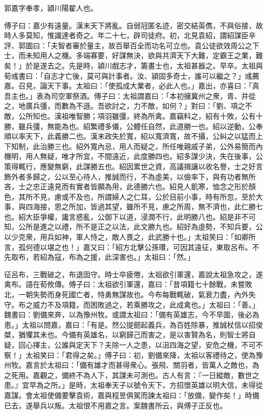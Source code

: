 
\begin{pinyinscope}
郭嘉字奉孝，潁川陽翟人也。

傅子曰：嘉少有遠量。漢末天下將亂。自弱冠匿名迹，密交結英儁，不與俗接，故時人多莫知，惟識達者奇之。年二十七，辟司徒府。初，北見袁紹，謂紹謀臣辛評、郭圖曰：「夫智者審於量主，故百舉百全而功名可立也。袁公徒欲效周公之下士，而未知用人之機。多端寡要，好謀無決，欲與共濟天下大難，定霸王之業，難矣！」於是遂去之。先是時，潁川戲志才，籌畫士也，太祖甚器之。早卒。太祖與荀彧書曰：「自志才亡後，莫可與計事者。汝、潁固多奇士，誰可以繼之？」彧薦嘉。召見，論天下事。太祖曰：「使孤成大業者，必此人也。」嘉出，亦喜曰：「真吾主也。」表為司空軍祭酒。傅子曰：太祖謂嘉曰：「本初擁冀州之衆，青、并從之，地廣兵彊，而數為不遜。吾欲討之，力不敵，如何？」對曰：「劉、項之不敵，公所知也。漢祖唯智勝；項羽雖彊，終為所禽。嘉竊料之，紹有十敗，公有十勝，雖兵彊，無能為也。紹繁禮多儀，公體任自然，此道勝一也。紹以逆動，公奉順以率天下，此義勝二也。漢末政失於寬，紹以寬濟寬，故不攝，公糾之以猛而上下知制，此治勝三也。紹外寬內忌，用人而疑之，所任唯親戚子弟，公外易簡而內機明，用人無疑，唯才所宜，不間遠近，此度勝四也。紹多謀少決，失在後事，公策得輒行，應變無窮，此謀勝五也。紹因累世之資，高議揖讓以收名譽，士之好言飾外者多歸之，公以至心待人，推誠而行，不為虛美，以儉率下，與有功者無所吝，士之忠正遠見而有實者皆願為用，此德勝六也。紹見人飢寒，恤念之形於顏色，其所不見，慮或不及也，所謂婦人之仁耳，公於目前小事，時有所忽，至於大事，與四海接，恩之所加，皆過其望，雖所不見，慮之所周，無不濟也，此仁勝七也。紹大臣爭權，讒言惑亂，公御下以道，浸潤不行，此明勝八也。紹是非不可知，公所是進之以禮，所不是正之以法，此文勝九也。紹好為虛勢，不知兵要，公以少克衆，用兵如神，軍人恃之，敵人畏之，此武勝十也。」太祖笑曰：「如卿所言，孤何德以堪之也！」嘉又曰：「紹方北擊公孫瓚，可因其遠征，東取呂布。不先取布，若紹為寇，布為之援，此深害也。」太祖曰：「然。」

征呂布，三戰破之，布退固守。時士卒疲倦，太祖欲引軍還，嘉說太祖急攻之，遂禽布。語在荀攸傳。傅子曰：太祖欲引軍還，嘉曰：「昔項籍七十餘戰，未嘗敗北，一朝失勢而身死國亡者，恃勇無謀故也。今布每戰輒破，氣衰力盡，內外失守。布之威力不及項籍，而困敗過之，若乘勝攻之，此成禽也。」太祖曰：「善。」魏書曰：劉備來奔，以為豫州牧。或謂太祖曰：「備有英雄志，今不早圖，後必為患。」太祖以問嘉，嘉曰：「有是。然公提劒起義兵，為百姓除暴，推誠杖信以招俊桀，猶懼其未也。今備有英雄名，以窮歸己而害之，是以害賢為名，則智士將自疑，回心擇主，公誰與定天下？夫除一人之患，以沮四海之望，安危之機，不可不察！」太祖笑曰：「君得之矣。」傅子曰：初，劉備來降，太祖以客禮待之，使為豫州牧。嘉言於太祖曰：「備有雄才而甚得衆心。張飛、關羽者，皆萬人之敵也，為之死用。嘉觀之，備終不為人下，其謀未可測也。古人有言：『一日縱敵，數世之患。』宜早為之所。」是時，太祖奉天子以號令天下，方招懷英雄以明大信，未得從嘉謀。會太祖使備要擊袁術，嘉與程昱俱駕而諫太祖曰：「放備，變作矣！」時備已去，遂舉兵以叛。太祖恨不用嘉之言。案魏書所云，與傅子正反也。


\end{pinyinscope}
